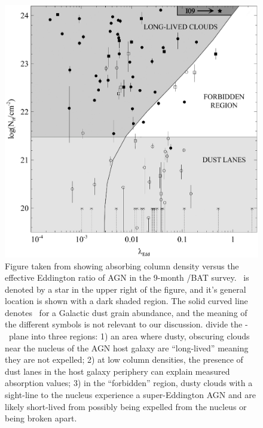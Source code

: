 \begin{figure}
  \begin{center}
    \begin{minipage}{0.5\linewidth}
      \includegraphics*[width=\textwidth]{f09.eps}
    \end{minipage}
    \caption{Figure taken from \citet{2009MNRAS.394L..89F} showing
      absorbing column density versus the effective Eddington ratio of
      AGN in the 9-month \swift/BAT survey. \irs\ is denoted by a star
      in the upper right of the figure, and it's general location is
      shown with a dark shaded region. The solid curved line denotes
      \leff\ for a Galactic dust grain abundance, and the meaning of
      the different symbols is not relevant to our
      discussion. \citet{2009MNRAS.394L..89F} divide the
      \leff-\nh\ plane into three regions: 1) an area where dusty,
      obscuring clouds near the nucleus of the AGN host galaxy are
      ``long-lived'' meaning they are not expelled; 2) at low column
      densities, the presence of dust lanes in the host galaxy
      periphery can explain measured absorption values; 3) in the
      ``forbidden'' region, dusty clouds with a sight-line to the
      nucleus experience a super-Eddington AGN and are likely
      short-lived from possibly being expelled from the nucleus or
      being broken apart.}
    \label{fig:f09}
  \end{center}
\end{figure}
